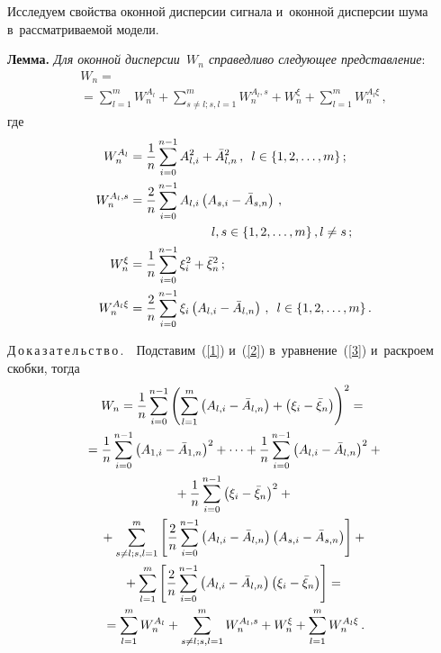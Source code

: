 \begin{multicols}{2}
Исследуем свойства оконной дисперсии сигнала и~оконной дисперсии 
шума в~рассматриваемой модели.

\noindent
\textbf{Лемма.} \textit{Для оконной дисперсии~$W_n$ 
справедливо следующее представление}:
\begin{multline}
\label{4}
W_n= {}\\
{}=\sum\limits_{l=1}^{m}W_n^{A_l} + 
\sum\limits_{s\neq l; s, l=1}^{m}\!\!W_n^{A_l,s} + W_n^{\xi} + 
\sum\limits_{l=1}^{m}W_n^{A_l\xi}\,,
\end{multline}
где
\begin{align*}
W_n^{A_l} &= \fr{1}{n}\sum\limits_{i=0}^{n-1}A_{l,i}^{2} + \bar{A}_{l,n}^{2}\,,
\enskip l \in \{1, 2, \ldots, m \}\,;
\\
W_n^{A_l,s} &= \fr{2}{n}\sum\limits_{i=0}^{n-1}A_{l,i}\left( A_{s,i} - 
\bar{A}_{s,n}\right)\,,\\
&\hspace*{23mm} l, s \in \{1, 2, \ldots, m \}\,, l \neq s\,;
\\
W_n^{\xi} &= \fr{1}{n}\sum\limits_{i=0}^{n-1}\xi_{i}^{2} + \bar{\xi}_{n}^{2}\,;
\\
W_n^{A_l\xi} &= \fr{2}{n}\sum\limits_{i=0}^{n-1}\xi_{i}\left( A_{l,i} - 
\bar{A}_{l,n}\right)\,,\enskip l \in \{1, 2, \ldots, m \}\,.
\end{align*}

\noindent
Д\,о\,к\,а\,з\,а\,т\,е\,л\,ь\,с\,т\,в\,о\,.\ \ 
Подставим~(\ref{1}) и~(\ref{2}) в~уравнение~(\ref{3}) и~раскроем скобки, тогда
\begin{multline*}
W_n= \displaystyle\frac{\displaystyle 1\mathstrut}{\displaystyle n\mathstrut}\sum\limits_{i=0}^{n-1}\left( \sum\limits_{l=1}^{m}\left( A_{l,i} - 
\bar{A}_{l,n} \right) + \left( \xi_{i} - \bar{\xi}_{n}\right) \right)^{2} ={}\\
{}= \displaystyle\frac{\displaystyle 1\mathstrut}{\displaystyle n\mathstrut}\sum\limits_{i=0}^{n-1}\left( A_{1,i} - \bar{A}_{1,n} \right)^{2} + \cdots 
+ \displaystyle\frac{\displaystyle 1\mathstrut}{\displaystyle n\mathstrut}\sum\limits_{i=0}^{n-1}\left( A_{l,i} - \bar{A}_{l,n} \right)^{2} + {}\\
{}+
\displaystyle\frac{\displaystyle 1\mathstrut}{\displaystyle n\mathstrut}\sum\limits_{i=0}^{n-1}\left( \xi_{i} - \bar{\xi}_{n}\right)^{2} +{}\\
{}+ \sum\limits_{s\neq l; s, l=1}^{m}\left[ \displaystyle\frac{\displaystyle 2\mathstrut}{\displaystyle n\mathstrut}\sum\limits_{i=0}^{n-1}\left( 
A_{l,i} - \bar{A}_{l,n}\right) \left( A_{s,i} - \bar{A}_{s,n}\right) \right] + {}\\
{}+
\sum\limits_{ l=1}^{m}\left[ \displaystyle\frac{\displaystyle 2\mathstrut}{\displaystyle n\mathstrut}\sum\limits_{i=0}^{n-1}\left( A_{l,i} - 
\bar{A}_{l,n}\right) \left( \xi_{i} - \bar{\xi}_{n}\right) \right] =  {}\\
{}= \sum\limits_{l=1}^{m}W_n^{A_l} + 
\sum\limits_{s\neq l; s, l=1}^{m}W_n^{A_l,s} + W_n^{\xi} + 
\sum\limits_{l=1}^{m}W_n^{A_l\xi} \,.
\end{multline*}


\end{multicols}
